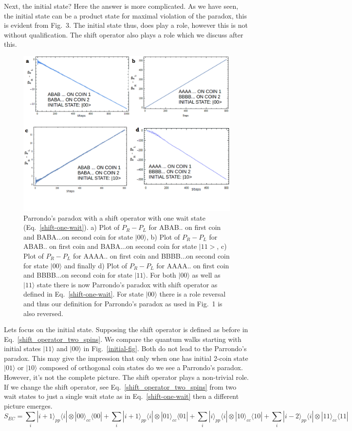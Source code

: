 \documentclass[english,aps,pra,amsmath,amssymb,showpacs,notitlepage,onecolumn]{revtex4-1}
\begin{document}
 Next, the initial state? Here the answer is more complicated. As we have seen, the initial state can be a product state for maximal violation of the paradox, this is evident from Fig.~3. The initial state thus, does play a role, however this is not without qualification. The shift operator also plays a role which we discuss after this. 
\begin{figure}[h]
\centering 
\includegraphics[width=.793\textwidth]{shift-fig.png}
\caption{ Parrondo's paradox with a shift operator with one wait state (Eq.~\ref{shift-one-wait}). a) Plot of  $P_{R}-P_{L}$ for ABAB.. on first coin and BABA...on second coin for state $|00\rangle$, b) Plot of  $P_{R}-P_{L}$ for ABAB.. on first coin and BABA...on second coin for state $|11>$, c) Plot of  $P_{R}-P_{L}$ for AAAA.. on first coin and BBBB...on second coin for state $|00\rangle$ and finally d) Plot of  $P_{R}-P_{L}$ for AAAA.. on first coin and BBBB...on second coin for state $|11\rangle$. For both $|00\rangle$ as well as $|11\rangle$ state there is now Parrondo's paradox with shift operator as defined in Eq.~\ref{shift-one-wait}. For state $|00\rangle$ there is a role reversal and thus our definition for Parrondo's paradox as used in Fig.~1 is also reversed. }
\label{shift-fig}
\end{figure}
Lets focus on the initial state. Supposing the shift operator is defined as  before in Eq.~\ref{shift_operator_two_spins}. We compare the quantum walks starting with initial states $|11\rangle$ and $|00\rangle$ in Fig.~\ref{initial-fig}. Both do not lead to the Parrondo's paradox. This may give the impression that only when one has initial 2-coin state $|01\rangle$ or $|10\rangle$ composed of orthogonal coin states do we see a Parrondo's paradox. However, it's not the complete picture. The shift operator plays a non-trivial role. If we change the shift operator, see Eq.~\ref{shift_operator_two_spins} from two wait states to just a single wait state as in Eq.~\ref{shift-one-wait} then a different picture emerges.
\begin{equation}
\label{shift-one-wait}
S_{EC} =  \sum_i |i+1 \rangle_{pp} \langle i| \otimes |00\rangle_{cc} \langle 00|  
+ \sum_i |i+1\rangle_{pp} \langle i| \otimes |01\rangle_{cc} \langle 01| 
+ \sum_i |i\rangle_{pp} \langle i| \otimes |10\rangle_{cc} \langle 10|
+ \sum_i |i-2 \rangle_{pp} \langle i| \otimes |11\rangle_{cc} \langle 11|
\end{equation}
\end{document}
